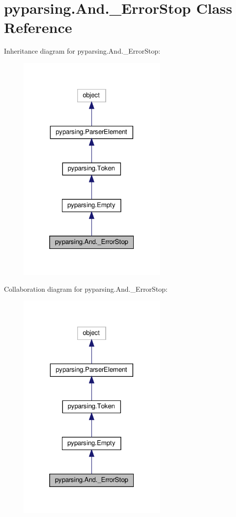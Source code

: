 \hypertarget{classpyparsing_1_1And_1_1__ErrorStop}{}\section{pyparsing.\+And.\+\_\+\+Error\+Stop Class Reference}
\label{classpyparsing_1_1And_1_1__ErrorStop}


Inheritance diagram for pyparsing.\+And.\+\_\+\+Error\+Stop\+:
\nopagebreak
\begin{figure}[H]
\begin{center}
\leavevmode
\includegraphics[width=208pt]{classpyparsing_1_1And_1_1__ErrorStop__inherit__graph}
\end{center}
\end{figure}


Collaboration diagram for pyparsing.\+And.\+\_\+\+Error\+Stop\+:
\nopagebreak
\begin{figure}[H]
\begin{center}
\leavevmode
\includegraphics[width=208pt]{classpyparsing_1_1And_1_1__ErrorStop__coll__graph}
\end{center}
\end{figure}
